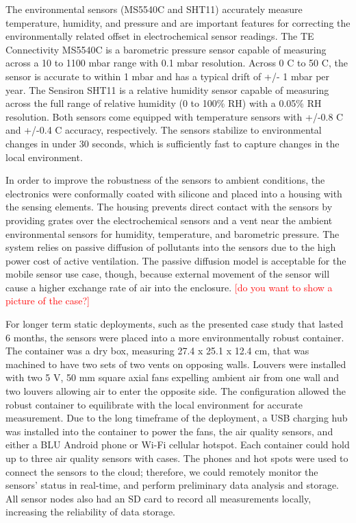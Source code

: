 \documentclass[journal abbreviation, manuscript]{copernicus}
\newcommand\todo[1]{\textcolor{red}{#1}}
\begin{document}
The environmental sensors (MS5540C and SHT11) accurately measure temperature, humidity, and pressure and are important features for correcting the environmentally related offset in electrochemical sensor readings. The TE Connectivity MS5540C is a barometric pressure sensor capable of measuring across a 10 to 1100 mbar range with 0.1 mbar resolution. Across 0 C to 50 C, the sensor is accurate to within 1 mbar and has a typical drift of +/- 1 mbar per year. The Sensiron SHT11 is a relative humidity sensor capable of measuring across the full range of relative humidity (0 to 100\% RH) with a 0.05\% RH resolution. Both sensors come equipped with temperature sensors with +/-0.8 C and +/-0.4 C accuracy, respectively. The sensors stabilize to environmental changes in under 30 seconds, which is sufficiently fast to capture changes in the local environment.

In order to improve the robustness of the sensors to ambient conditions, the electronics were conformally coated with silicone and placed into a housing with the sensing elements. The housing prevents direct contact with the sensors by providing grates over the electrochemical sensors and a vent near the ambient environmental sensors for humidity, temperature, and barometric pressure. The system relies on passive diffusion of pollutants into the sensors due to the high power cost of active ventilation. The passive diffusion model is acceptable for the mobile sensor use case, though, because external movement of the sensor will cause a higher exchange rate of air into the enclosure. \todo{[do you want to show a picture of the case?]}  

For longer term static deployments, such as the presented case study that lasted 6 months, the sensors were placed into a more environmentally robust container. The container was a dry box, measuring 27.4 x 25.1 x 12.4 cm, that was machined to have two sets of two vents on opposing walls. Louvers were installed with two 5 V, 50 mm square axial fans expelling ambient air from one wall and two louvers allowing air to enter the opposite side. The configuration allowed the robust container to equilibrate with the local environment for accurate measurement. Due to the long timeframe of the deployment, a USB charging hub was installed into the container to power the fans, the air quality sensors, and either a BLU Android phone or Wi-Fi cellular hotspot. Each container could hold up to three air quality sensors with cases. The phones and hot spots were used to connect the sensors to the cloud; therefore, we could remotely monitor the sensors’ status in real-time, and perform preliminary data analysis and storage. All sensor nodes also had an SD card to record all measurements locally, increasing the reliability of data storage. 
\end{document}
